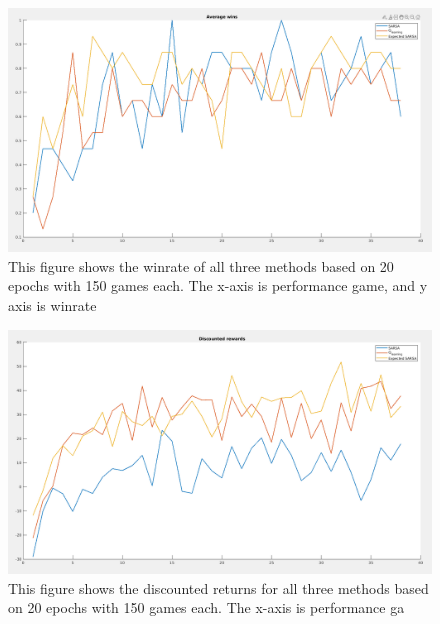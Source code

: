 \begin{figure}[H]
    \centering
    \includegraphics[width=\linewidth]{img/Win_rate_graph.png}
    \caption{This figure shows the winrate of all three methods based on 20 epochs with 150 games each. The x-axis is performance game, and y axis is winrate}
    \label{fig:winrate_graph}
\end{figure}


\begin{figure}[H]
    \centering
    \includegraphics[width=\linewidth]{img/Discounted_rewards.png}
    \caption{This figure shows the discounted returns for all three methods based on 20 epochs with 150 games each. The x-axis is performance ga}
    \label{fig:discounted_returns}
\end{figure}
